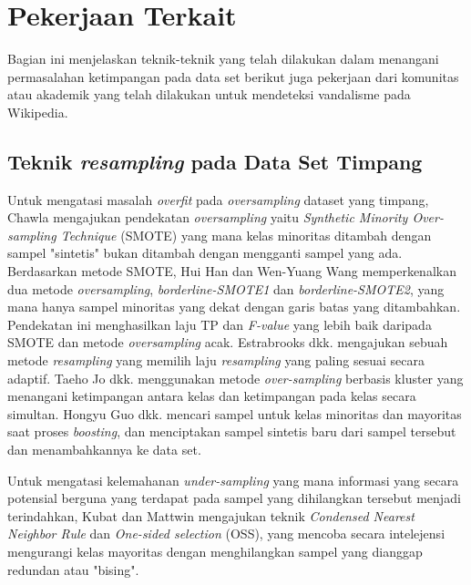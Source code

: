 \documentclass[12pt,a4paper,titlepage]{article}
\begin{document}
\label{sec:pekerjaan-terkait}
\section{Pekerjaan Terkait}

Bagian ini menjelaskan teknik-teknik yang telah dilakukan dalam menangani permasalahan ketimpangan pada data set berikut juga pekerjaan dari komunitas atau akademik yang telah dilakukan untuk mendeteksi vandalisme pada Wikipedia.

\label{subsec:teknik-resampling-dataset-timpang}
\subsection{Teknik \textit{resampling} pada Data Set Timpang}

Untuk mengatasi masalah \textit{overfit} pada \textit{oversampling} dataset yang timpang, Chawla \cite{chawla2002smote} mengajukan pendekatan \textit{oversampling} yaitu \textit{Synthetic Minority Over-sampling Technique} (SMOTE) yang mana kelas minoritas ditambah dengan sampel "sintetis" bukan ditambah dengan mengganti sampel yang ada.
Berdasarkan metode SMOTE, Hui Han dan Wen-Yuang Wang \cite{han2005borderline} memperkenalkan dua metode \textit{oversampling}, \textit{borderline-SMOTE1} dan \textit{borderline-SMOTE2}, yang mana hanya sampel minoritas yang dekat dengan garis batas yang ditambahkan.
Pendekatan ini menghasilkan laju TP dan \textit{F-value} yang lebih baik daripada SMOTE dan metode \textit{oversampling} acak.
Estrabrooks dkk. \cite{estabrooks2004multiple} mengajukan sebuah metode \textit{resampling} yang memilih laju \textit{resampling} yang paling sesuai secara adaptif.
Taeho Jo dkk. \cite{jo2004class} menggunakan metode \textit{over-sampling} berbasis kluster yang menangani ketimpangan antara kelas dan ketimpangan pada kelas secara simultan.
Hongyu Guo dkk. \cite{guo2004learning} mencari sampel untuk kelas minoritas dan mayoritas saat proses \textit{boosting}, dan menciptakan sampel sintetis baru dari sampel tersebut dan menambahkannya ke data set.

Untuk mengatasi kelemahanan \textit{under-sampling} yang mana informasi yang secara potensial berguna yang terdapat pada sampel yang dihilangkan tersebut menjadi terindahkan, Kubat dan Mattwin \cite{kubat1997addressing} mengajukan teknik \textit{Condensed Nearest Neighbor Rule} dan \textit{One-sided selection} (OSS), yang mencoba secara intelejensi mengurangi kelas mayoritas dengan menghilangkan sampel yang dianggap redundan atau "bising".
\end{document}
